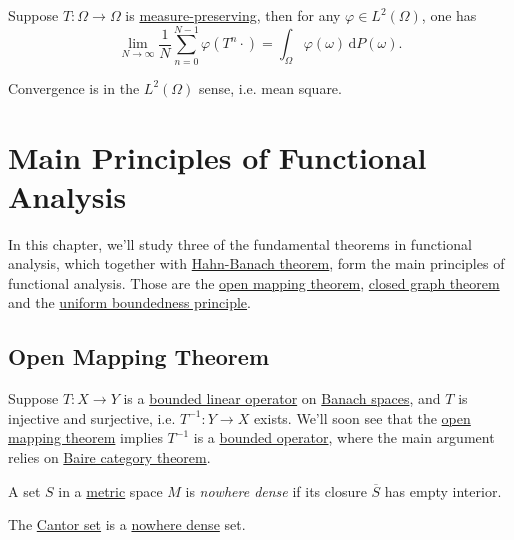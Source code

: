 \begin{theorem}\label{von-Newmann-ergodic}
	Suppose \(T\colon \Omega \to \Omega\) is \hyperref[def:measure-preserving]{measure-preserving}, then for any \(\varphi \in L^2(\Omega)\), one has
	\[
		\lim_{N \to \infty} \frac{1}{N} \sum_{n=0}^{N-1} \varphi(T^n \cdot) = \int_\Omega \varphi(\omega) \,\mathrm{d} P(\omega).
	\]
\end{theorem}
\begin{remark}
	Convergence is in the \(L^2(\Omega)\) sense, i.e. mean square.
\end{remark}

\chapter{Main Principles of Functional Analysis}
In this chapter, we'll study three of the fundamental theorems in functional analysis, which together with \hyperref[thm:Hahn-Banach]{Hahn-Banach theorem}, form the main principles of functional analysis. Those are the \hyperref[thm:open-mapping]{open mapping theorem}, \hyperref[thm:closed-graph]{closed graph theorem} and the \hyperref[thm:uniform-boundedness]{uniform boundedness principle}.
\section{Open Mapping Theorem}

Suppose \(T\colon X \to Y\) is a \hyperref[def:bounded-linear-op]{bounded linear operator} on \hyperref[def:Banach-space]{Banach spaces}, and \(T\) is injective and surjective, i.e. \(T^{-1}\colon Y \to X\) exists. We'll soon see that the \hyperref[thm:open-mapping]{open mapping theorem} implies \(T^{-1}\) is a \hyperref[rmk:bounded-op]{bounded operator}, where the main argument relies on \hyperref[prop:Baire-category]{Baire category theorem}.

\begin{definition}\label{def:nowhere-dense}
	A set \(S\) in a \hyperref[prev:metric]{metric} space \(M\) is \emph{nowhere dense} if its closure \(\overline{S}\) has empty interior.
\end{definition}

\begin{eg}
	The \href{https://en.wikipedia.org/wiki/Cantor_set}{Cantor set} is a \hyperref[def:nowhere-dense]{nowhere dense} set.
\end{eg}
